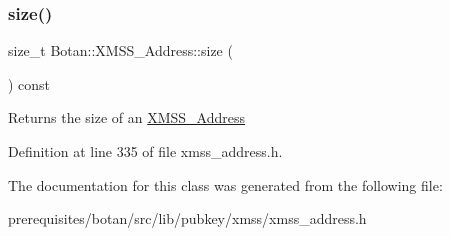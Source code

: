 \mbox{\label{class_botan_1_1_x_m_s_s___address_a295db70b7603a66df6ebf20667dc9a9f}} 
\subsubsection{\texorpdfstring{size()}{size()}}
{\footnotesize\ttfamily size\+\_\+t Botan\+::\+X\+M\+S\+S\+\_\+\+Address\+::size (\begin{DoxyParamCaption}{ }\end{DoxyParamCaption}) const\hspace{0.3cm}{\ttfamily [inline]}}

\begin{DoxyReturn}{Returns}
the size of an \mbox{\hyperlink{class_botan_1_1_x_m_s_s___address}{X\+M\+S\+S\+\_\+\+Address}} 
\end{DoxyReturn}


Definition at line 335 of file xmss\+\_\+address.\+h.



The documentation for this class was generated from the following file\+:\begin{DoxyCompactItemize}
\item 
prerequisites/botan/src/lib/pubkey/xmss/xmss\+\_\+address.\+h\end{DoxyCompactItemize}
